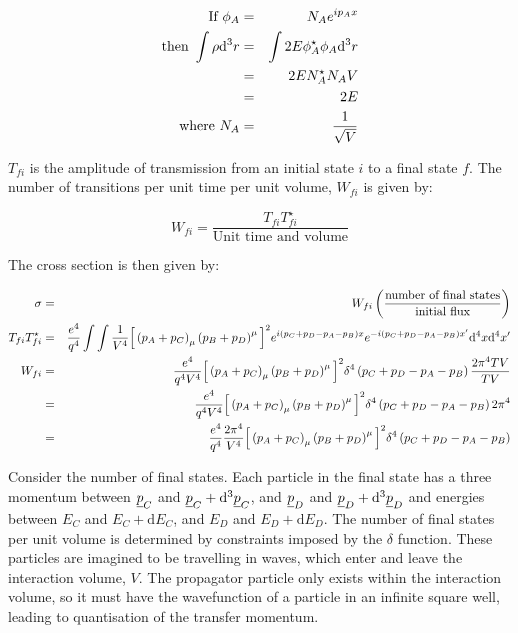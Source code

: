 \begin{eqnarray*}
  \textrm{If }\phi_A & = & N_Ae^{ip_Ax} \\
  \textrm{then }\int\rho\mathrm{d}^3r & = & \int 2E\phi^{\star}_A\phi_A\mathrm{d}^3r \\
  & = & 2EN^{\star}_AN_AV \\
  & = & 2E \\
  \textrm{where }N_A & = & \frac{1}{\sqrt{V}}
\end{eqnarray*}

$T_{fi}$ is the amplitude of transmission from an initial state $i$ to a final state $f$.  The number of transitions per unit time per unit volume, $W_{fi}$ is given by:

\[
  W_{fi} = \frac{T_{fi}T^{\star}_{fi}}{\textrm{Unit time and volume}}
\]

The cross section is then given by:

\begin{eqnarray*}
  \sigma & = & W_{fi}\left(\frac{\textrm{number of final states}}{\textrm{initial flux}}\right) \\
  T_{fi}T^{\star}_{fi} & = & \frac{e^4}{q^4}\int\int \frac{1}{V^4}\Big[\left(p_A+p_C\right)_{\mu}\left(p_B+p_D\right)^{\mu}\Big]^2 e^{i\left(p_C+p_D-p_A-p_B\right)x}e^{-i\left(p_C+p_D-p_A-p_B\right)x'}\mathrm{d}^4x\mathrm{d}^4x' \\
  W_{fi} & = & \frac{e^4}{q^4V^4}\Big[\left(p_A+p_C\right)_{\mu}\left(p_B+p_D\right)^{\mu}\Big]^2\delta^4\left(p_C+p_D-p_A-p_B\right)\frac{2\pi^4TV}{TV} \\
  & = & \frac{e^4}{q^4V^4}\Big[\left(p_A+p_C\right)_{\mu}\left(p_B+p_D\right)^{\mu}\Big]^2\delta^4\left(p_C+p_D-p_A-p_B\right)2\pi^4 \\
  & = & \frac{e^4}{q^4}\frac{2\pi^4}{V^4}\Big[\left(p_A+p_C\right)_{\mu}\left(p_B+p_D\right)^{\mu}\Big]^2\delta^4\left(p_C+p_D-p_A-p_B\right)
\end{eqnarray*}

Consider the number of final states.  Each particle in the final state has a three momentum between $\underline{p}_C$ and $\underline{p}_C + \mathrm{d}^3\underline{p}_C$, and $\underline{p}_D$ and $\underline{p}_D + \mathrm{d}^3\underline{p}_D$ and energies between $E_C$ and $E_C + \mathrm{d}E_C$, and $E_D$ and $E_D + \mathrm{d}E_D$.  The number of final states per unit volume is determined by constraints imposed by the $\delta$ function.  These particles are imagined to be travelling in waves, which enter and leave the interaction volume, $V$.  The propagator particle only exists within the interaction volume, so it must have the wavefunction of a particle in an infinite square well, leading to quantisation of the transfer momentum.

